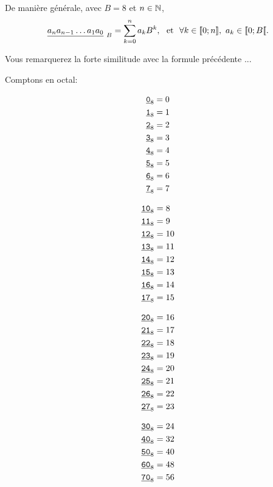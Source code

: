 De manière générale, avec $B=8$ et $n\in\N$,
$$\displaystyle\underline{a_{n}a_{n-1}\ldots a_{1}a_{0}}_{~B} =
\sum_{k=0}^{n}a_{k}B^{k},~ \textrm{ et }~\forall k \in \iif{0;n},~ a_k\in\ii{0;B}.$$ 

Vous remarquerez la forte similitude avec la formule précédente ...

Comptons en octal:

\begin{minipage}[t]{0.18\linewidth}
\begin{align*}
\oct{0} &= 0\\
\oct{1} &= 1\\
\oct{2} &= 2\\
\oct{3} &= 3\\
\oct{4} &= 4\\
\oct{5} &= 5\\
\oct{6} &= 6\\
\oct{7} &= 7\\
\end{align*}
\end{minipage}
\begin{minipage}[t]{0.18\linewidth}
\begin{align*}
\oct{10} &= 8\\
\oct{11} &= 9\\
\oct{12} &= 10\\
\oct{13} &= 11\\
\oct{14} &= 12\\
\oct{15} &= 13\\
\oct{16} &= 14\\
\oct{17} &= 15\\
\end{align*}
\end{minipage}
\begin{minipage}[t]{0.18\linewidth}
\begin{align*}  
\oct{20} &= 16\\
\oct{21} &= 17\\
\oct{22} &= 18\\
\oct{23} &= 19\\
\oct{24} &= 20\\
\oct{25} &= 21\\
\oct{26} &= 22\\
\oct{27} &= 23\\
\end{align*}
\end{minipage}
\begin{minipage}[t]{0.18\linewidth}
\begin{align*}
\oct{30} &= 24\\
\oct{40} &= 32\\
\oct{50} &= 40\\
\oct{60} &= 48\\
\oct{70} &= 56\\
\end{align*}
\end{minipage}

